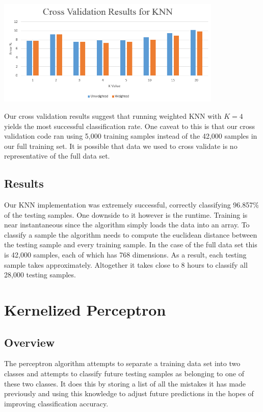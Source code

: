 \documentclass{article} %
\begin{document}
\begin{center}
\includegraphics[width=406px]{KNN_CrossValidation.png}
\end{center}

Our cross validation results suggest that running weighted KNN with $K = 4$
yields the most successful classification rate. One caveat to this is that our
cross validation code ran using 5,000 training samples instead of the 42,000
samples in our full training set. It is possible that data we used to cross
validate is no representative of the full data set.

\subsection{Results}

Our KNN implementation was extremely successful, correctly classifying 96.857\%
of the testing samples. One downside to it however is the runtime. Training is
near instantaneous since the algorithm simply loads the data into an array. To
classify a sample the algorithm needs to compute the euclidean distance between
the testing sample and every training sample. In the case of the full data set
this is 42,000 samples, each of which has 768 dimensions. As a result, each
testing sample takes approximately. Altogether it takes close to 8 hours to
classify all 28,000 testing samples.

\section{Kernelized Perceptron}
\subsection{Overview}

The perceptron algorithm attempts to separate a training data set into two
classes and attempts to classify future testing samples as belonging to one of
these two classes. It does this by storing a list of all the mistakes it has
made previously and using this knowledge to adjust future predictions in the
hopes of improving classification accuracy. 
\end{document}
